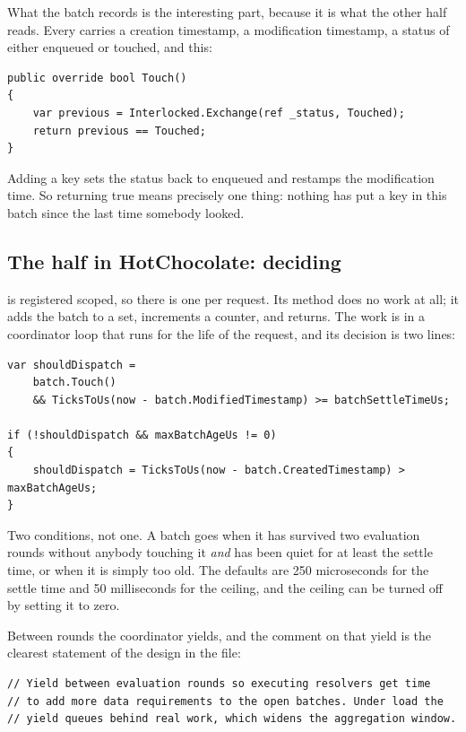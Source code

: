 %
What the batch records is the interesting part, because it is what the other half
reads. Every  carries a creation timestamp, a modification timestamp,
a status of either enqueued or touched, and this:

\begin{verbatim}
public override bool Touch()
{
    var previous = Interlocked.Exchange(ref _status, Touched);
    return previous == Touched;
}
\end{verbatim}

Adding a key sets the status back to enqueued and restamps the modification
time. So  returning true means precisely one thing: nothing has put a
key in this batch since the last time somebody looked.

\subsection*{The half in HotChocolate: deciding}

%
 is registered scoped, so there is one per request. Its
 method does no work at all; it adds the batch to a set,
increments a counter, and returns. The work is in a coordinator loop that runs
for the life of the request, and its decision is two lines:

\begin{verbatim}
var shouldDispatch =
    batch.Touch()
    && TicksToUs(now - batch.ModifiedTimestamp) >= batchSettleTimeUs;

if (!shouldDispatch && maxBatchAgeUs != 0)
{
    shouldDispatch = TicksToUs(now - batch.CreatedTimestamp) > maxBatchAgeUs;
}
\end{verbatim}

%
Two conditions, not one. A batch goes when it has survived two evaluation rounds
without anybody touching it \emph{and} has been quiet for at least the settle
time, or when it is simply too old. The defaults are 250 microseconds for the
settle time and 50 milliseconds for the ceiling, and the ceiling can be turned
off by setting it to zero.

Between rounds the coordinator yields, and the comment on that yield is the
clearest statement of the design in the file:

\begin{verbatim}
// Yield between evaluation rounds so executing resolvers get time
// to add more data requirements to the open batches. Under load the
// yield queues behind real work, which widens the aggregation window.
\end{verbatim}

